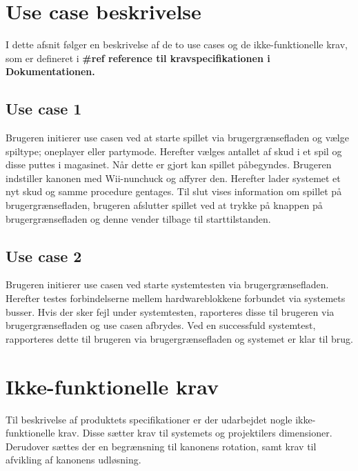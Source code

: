\newpage
\section{Use case beskrivelse}
I dette afsnit følger en beskrivelse af de to use cases og de ikke-funktionelle krav, som er defineret i \textbf{\#ref reference til kravspecifikationen i Dokumentationen.}
\subsection{Use case 1}
Brugeren initierer use casen ved at starte spillet via brugergrænsefladen og vælge spiltype; oneplayer eller partymode. Herefter vælges antallet af skud i et spil og disse puttes i magasinet. Når dette er gjort kan spillet påbegyndes. Brugeren indstiller kanonen med Wii-nunchuck og affyrer den. Herefter lader systemet et nyt skud og samme procedure gentages. Til slut vises information om spillet på brugergrænsefladen, brugeren afslutter spillet ved at trykke på knappen på brugergrænsefladen og denne vender tilbage til starttilstanden. 

\subsection{Use case 2}
Brugeren initierer use casen ved starte systemtesten via brugergrænsefladen. Herefter testes forbindelserne mellem hardwareblokkene forbundet via systemets busser. Hvis der sker fejl under systemtesten, raporteres disse til brugeren via brugergrænsefladen og use casen afbrydes. Ved en successfuld systemtest, rapporteres dette til brugeren via brugergrænsefladen og systemet er klar til brug.

\section{Ikke-funktionelle krav}
Til beskrivelse af produktets specifikationer er der udarbejdet nogle ikke-funktionelle krav. Disse sætter krav til systemets og projektilers dimensioner. Derudover sættes der en begrænsning til kanonens rotation, samt krav til afvikling af kanonens udløsning.  








